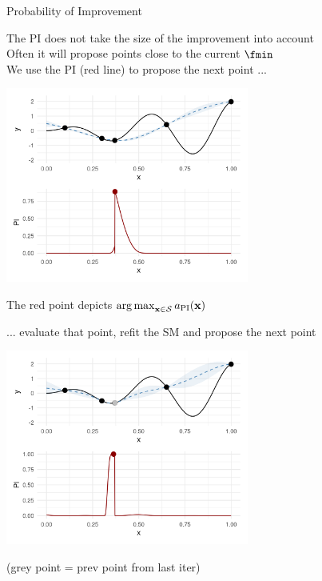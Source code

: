 \documentclass[11pt,compress,t,notes=noshow, xcolor=table]{beamer}
\begin{document}
\begin{vbframe}{Probability of Improvement}

The PI does not take the size of the improvement into account\\
Often it will propose points close to the current $\fmin$\\
\vspace{1em}
We use the PI (red line) to propose the next point ...
\vspace{-1em}
\begin{center}
  \includegraphics[width = 0.6\textwidth]{figure_man/bayesian_loop_pi_1.png}
\end{center}

The red point depicts $\operatorname*{arg\,max}_{\mathbf{x} \in \mathcal{S}} a_{\text{PI}}(\mathbf{x})$

\framebreak

... evaluate that point, refit the SM and propose the next point

\begin{center}
  \includegraphics[width = 0.6\textwidth]{figure_man/bayesian_loop_pi_2.png}
\end{center}

(grey point = prev point from last iter)

\end{vbframe}
\end{document}
